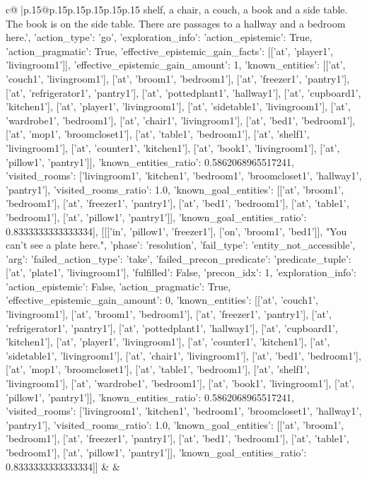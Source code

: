 \documentclass{article}
\begin{document}
{\begin{supertabular}{c@{$\;$}|p{.15\linewidth}@{}p{.15\linewidth}p{.15\linewidth}p{.15\linewidth}p{.15\linewidth}p{.15\linewidth}}
{{{shelf, a chair, a couch, a book and a side table. The book is on the side table. There are passages to a hallway and a bedroom here.', {'action_type': 'go', 'exploration_info': {'action_epistemic': True, 'action_pragmatic': True, 'effective_epistemic_gain_facts': [['at', 'player1', 'livingroom1']], 'effective_epistemic_gain_amount': 1, 'known_entities': [['at', 'couch1', 'livingroom1'], ['at', 'broom1', 'bedroom1'], ['at', 'freezer1', 'pantry1'], ['at', 'refrigerator1', 'pantry1'], ['at', 'pottedplant1', 'hallway1'], ['at', 'cupboard1', 'kitchen1'], ['at', 'player1', 'livingroom1'], ['at', 'sidetable1', 'livingroom1'], ['at', 'wardrobe1', 'bedroom1'], ['at', 'chair1', 'livingroom1'], ['at', 'bed1', 'bedroom1'], ['at', 'mop1', 'broomcloset1'], ['at', 'table1', 'bedroom1'], ['at', 'shelf1', 'livingroom1'], ['at', 'counter1', 'kitchen1'], ['at', 'book1', 'livingroom1'], ['at', 'pillow1', 'pantry1']], 'known_entities_ratio': 0.5862068965517241, 'visited_rooms': ['livingroom1', 'kitchen1', 'bedroom1', 'broomcloset1', 'hallway1', 'pantry1'], 'visited_rooms_ratio': 1.0, 'known_goal_entities': [['at', 'broom1', 'bedroom1'], ['at', 'freezer1', 'pantry1'], ['at', 'bed1', 'bedroom1'], ['at', 'table1', 'bedroom1'], ['at', 'pillow1', 'pantry1']], 'known_goal_entities_ratio': 0.8333333333333334}}], [[['in', 'pillow1', 'freezer1'], ['on', 'broom1', 'bed1']], "You can't see a plate here.", {'phase': 'resolution', 'fail_type': 'entity_not_accessible', 'arg': {'failed_action_type': 'take', 'failed_precon_predicate': {'predicate_tuple': ['at', 'plate1', 'livingroom1'], 'fulfilled': False, 'precon_idx': 1}}, 'exploration_info': {'action_epistemic': False, 'action_pragmatic': True, 'effective_epistemic_gain_amount': 0, 'known_entities': [['at', 'couch1', 'livingroom1'], ['at', 'broom1', 'bedroom1'], ['at', 'freezer1', 'pantry1'], ['at', 'refrigerator1', 'pantry1'], ['at', 'pottedplant1', 'hallway1'], ['at', 'cupboard1', 'kitchen1'], ['at', 'player1', 'livingroom1'], ['at', 'counter1', 'kitchen1'], ['at', 'sidetable1', 'livingroom1'], ['at', 'chair1', 'livingroom1'], ['at', 'bed1', 'bedroom1'], ['at', 'mop1', 'broomcloset1'], ['at', 'table1', 'bedroom1'], ['at', 'shelf1', 'livingroom1'], ['at', 'wardrobe1', 'bedroom1'], ['at', 'book1', 'livingroom1'], ['at', 'pillow1', 'pantry1']], 'known_entities_ratio': 0.5862068965517241, 'visited_rooms': ['livingroom1', 'kitchen1', 'bedroom1', 'broomcloset1', 'hallway1', 'pantry1'], 'visited_rooms_ratio': 1.0, 'known_goal_entities': [['at', 'broom1', 'bedroom1'], ['at', 'freezer1', 'pantry1'], ['at', 'bed1', 'bedroom1'], ['at', 'table1', 'bedroom1'], ['at', 'pillow1', 'pantry1']], 'known_goal_entities_ratio': 0.8333333333333334}}]] 
	  } 
	   } 
	   } 
	 & & \\ 
 


\end{supertabular}}
\end{document}
